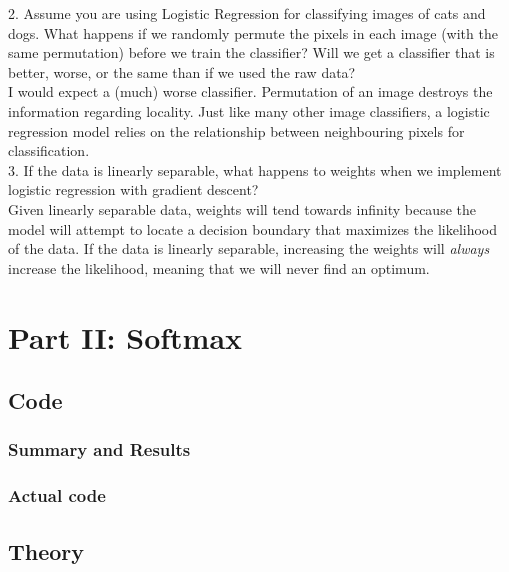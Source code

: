 \documentclass[english,11pt,a4paper,titlepage]{report}
\begin{document}
	\pagebreak
	
	2. Assume you are using Logistic Regression for classifying images of cats and dogs. What happens if we randomly permute the pixels in each image (with the same permutation) before we train the classifier? Will we get a classifier that is better, worse, or the same than if we used the raw data?
	\\
	
	I would expect a (much) worse classifier. Permutation of an image destroys the information regarding locality. Just like many other image classifiers, a logistic regression model relies on the relationship between neighbouring pixels for classification. \\
	
	3. If the data is linearly separable, what happens to weights when we implement logistic regression with gradient descent?
	\\
	
	Given linearly separable data, weights will tend towards infinity because the model will attempt to locate a decision boundary that maximizes the likelihood of the data. If the data is linearly separable, increasing the weights will \textit{always} increase the likelihood, meaning that we will never find an optimum.
	
	\section{Part II: Softmax}
	\subsection{Code}
	\subsubsection{Summary and Results}
	
	\subsubsection{Actual code}
	
	\subsection{Theory}	
	
	
	
	
	
\end{document}
